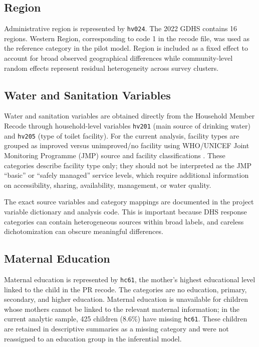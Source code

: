 \subsection{Region}

Administrative region is represented by \texttt{hv024}. The 2022 GDHS contains 16 regions. Western Region, corresponding to code 1 in the recode file, was used as the reference category in the pilot model. Region is included as a fixed effect to account for broad observed geographical differences while community-level random effects represent residual heterogeneity across survey clusters.

\subsection{Water and Sanitation Variables}

Water and sanitation variables are obtained directly from the Household Member Recode through household-level variables \texttt{hv201} (main source of drinking water) and \texttt{hv205} (type of toilet facility). For the current analysis, facility types are grouped as improved versus unimproved/no facility using WHO/UNICEF Joint Monitoring Programme (JMP) source and facility classifications \citep{WHOUNICEFJMP2021}. These categories describe facility type only; they should not be interpreted as the JMP ``basic'' or ``safely managed'' service levels, which require additional information on accessibility, sharing, availability, management, or water quality.

The exact source variables and category mappings are documented in the project variable dictionary and analysis code. This is important because DHS response categories can contain heterogeneous sources within broad labels, and careless dichotomization can obscure meaningful differences.

\subsection{Maternal Education}

Maternal education is represented by \texttt{hc61}, the mother's highest educational level linked to the child in the PR recode. The categories are no education, primary, secondary, and higher education. Maternal education is unavailable for children whose mothers cannot be linked to the relevant maternal information; in the current analytic sample, 425 children (8.6\%) have missing \texttt{hc61}. These children are retained in descriptive summaries as a missing category and were not reassigned to an education group in the inferential model.

